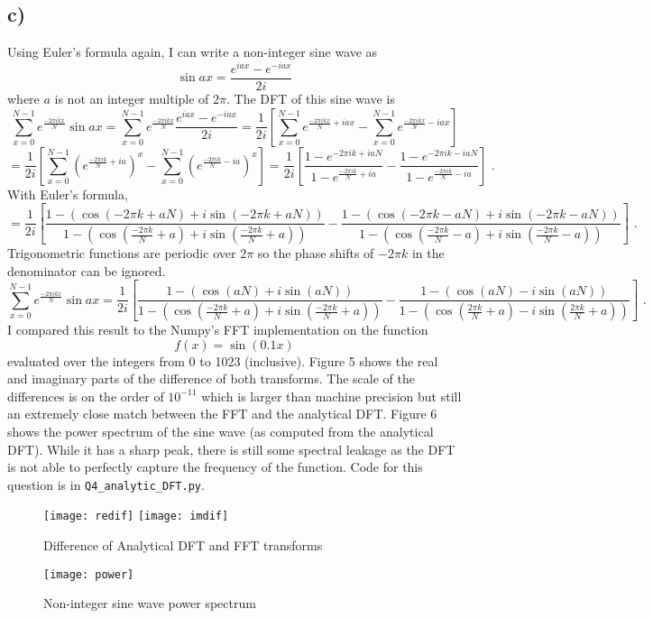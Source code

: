 \documentclass{article}
\newcommand{\<}[1]{\left\langle #1 \right\rangle }
\begin{document}
\subsection{c)}
Using Euler's formula again, I can write a non-integer sine wave as 
\[\sin{ax} = \frac{e^{iax} - e^{-iax}}{2i}\]
where $a$ is not an integer multiple of $2\pi$. The DFT of this sine wave is 
\[ \sum_{x=0}^{N-1} e^{\frac{-2\pi i k x}{N}} \sin{ax} = \sum_{x=0}^{N-1} e^{\frac{-2\pi i k x}{N}} \frac{e^{iax} - e^{-iax}}{2i} = \frac{1}{2i}\left[\sum_{x=0}^{N-1} e^{\frac{-2\pi i k x}{N} + iax} - \sum_{x=0}^{N-1} e^{\frac{-2\pi i k x}{N} - iax}\right] \]
\[ = \frac{1}{2i}\left[ \sum_{x=0}^{N-1} \left(e^{\frac{-2\pi i k }{N} + ia}\right)^x - \sum_{x=0}^{N-1} \left(e^{\frac{-2\pi i k}{N} - ia}\right)^x \right] = \frac{1}{2i}\left[ \frac{1 - e^{-2\pi i k + iaN}}{1 - e^{\frac{-2\pi i k}{N} + ia}} - \frac{1 - e^{-2\pi i k - iaN}}{1 - e^{\frac{-2\pi i k}{N} - ia}} \right] \text{ .}\]
With Euler's formula, 
\[ = \frac{1}{2i}\left[ \frac{1 - (\cos(-2\pi k + aN) + i\sin(-2\pi k + aN) )}{1 - \left(\cos\left(\frac{-2\pi k}{N} + a\right) + i\sin\left(\frac{-2\pi k}{N} + a\right)\right)} - \frac{1 - (\cos(-2\pi k - aN) + i\sin(-2\pi k - aN) )}{1 - \left(\cos\left(\frac{-2\pi k}{N} - a\right) + i\sin\left(\frac{-2\pi k}{N} - a\right)\right)} \right] \text{ .} \]
Trigonometric functions are periodic over $2\pi$ so the phase shifts of $-2\pi k$ in the denominator can be ignored.
\[ \sum_{x=0}^{N-1} e^{\frac{-2\pi i k x}{N}} \sin{ax} = \frac{1}{2i}\left[ \frac{1 - (\cos(aN) + i\sin(aN))}{1 - \left(\cos\left(\frac{-2\pi k}{N} + a\right) + i\sin\left(\frac{-2\pi k}{N} + a\right)\right)} - \frac{1 - (\cos(aN) - i\sin(aN) )}{1 - \left(\cos\left(\frac{2\pi k}{N} + a\right) - i\sin\left(\frac{2\pi k}{N} + a\right)\right)} \right] \text{ .} \]
I compared this result to the Numpy's FFT implementation on the function
\[f(x) = \sin(0.1 x)\]
evaluated over the integers from 0 to 1023 (inclusive). Figure 5 shows the real and imaginary parts of the difference of both transforms. The scale of the differences is on the order of $10^{-11}$ which is larger than machine precision but still an extremely close match between the FFT and the analytical DFT. Figure 6 shows the power spectrum of the sine wave (as computed from the analytical DFT). While it has a sharp peak, there is still some spectral leakage as the DFT is not able to perfectly capture the frequency of the function. Code for this question is in \texttt{Q4\_analytic\_DFT.py}.

\begin{figure}[h]
	\caption{Difference of Analytical DFT and FFT transforms}
	\centering
	\texttt{[image: redif]}
	\texttt{[image: imdif]}
\end{figure}
\begin{figure}[h]
	\caption{Non-integer sine wave power spectrum}
	\centering
	\texttt{[image: power]}
\end{figure}
\end{document}
